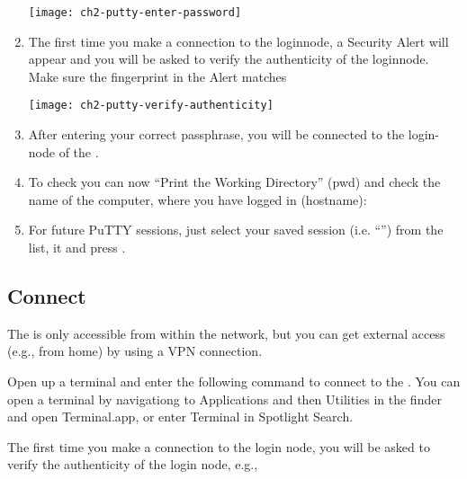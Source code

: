 \begin{enumerate}
  \texttt{[image: ch2-putty-enter-password]}

    \item  The first time you make a connection to the loginnode, a Security
      Alert will appear and you will be asked to verify the authenticity of the
      loginnode.
      \ifgent
      Make sure the fingerprint in the Alert matches \strong{\loginfingerprint}
      \fi

  \texttt{[image: ch2-putty-verify-authenticity]}

    \item  After entering your correct passphrase, you will be connected to the
      login-node of the \hpc.
    \item  To check you can now ``Print the Working Directory'' (pwd) and check
      the name of the computer, where you have logged in (hostname):

  \begin{prompt}
  \end{prompt}

    \item  For future PuTTY sessions, just select your saved session (i.e.
      ``\emph{\hpcname}'') from the list,  it and press
      .
  \end{enumerate}

\fi

\ifmacORlinux
\subsection{Connect}
\label{sec:connect}

The \hpc is only accessible from within the \university network, but you can
get external access (e.g., from home) by using a VPN connection.

Open up a terminal and enter the following command to connect to the \hpc.
\ifmac
You can open a terminal by navigationg to Applications and then Utilities in the finder and open Terminal.app, or enter Terminal in Spotlight Search.
\fi

\begin{prompt}
\end{prompt}

The first time you make a connection to the login node, you will be asked to
verify the authenticity of the login node, e.g.,

